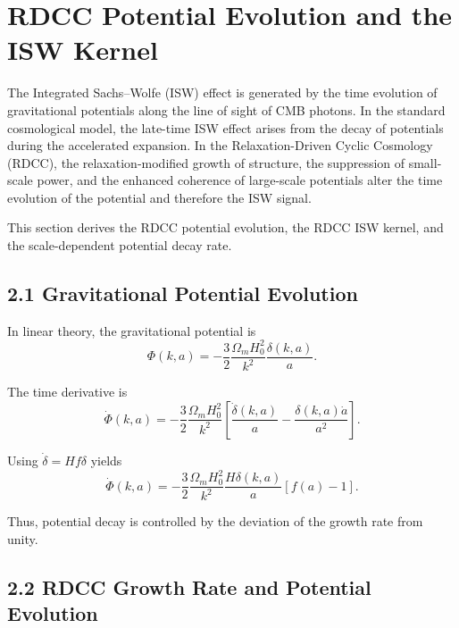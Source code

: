 \documentclass[11pt,a4paper]{article}
\begin{document}
\section{RDCC Potential Evolution and the ISW Kernel}

The Integrated Sachs–Wolfe (ISW) effect is generated by the time evolution of gravitational 
potentials along the line of sight of CMB photons. In the standard cosmological model, the 
late-time ISW effect arises from the decay of potentials during the accelerated expansion. 
In the Relaxation-Driven Cyclic Cosmology (RDCC), the relaxation-modified growth of 
structure, the suppression of small-scale power, and the enhanced coherence of large-scale 
potentials alter the time evolution of the potential and therefore the ISW signal.

This section derives the RDCC potential evolution, the RDCC ISW kernel, and the 
scale-dependent potential decay rate.

\subsection*{2.1 Gravitational Potential Evolution}

In linear theory, the gravitational potential is
\begin{equation}
    \Phi(k,a)
    = -\frac{3}{2}\frac{\Omega_{m}H_{0}^{2}}{k^{2}}
      \frac{\delta(k,a)}{a}.
\end{equation}

The time derivative is
\begin{equation}
    \dot{\Phi}(k,a)
    = -\frac{3}{2}\frac{\Omega_{m}H_{0}^{2}}{k^{2}}
      \left[
        \frac{\dot{\delta}(k,a)}{a}
        - \frac{\delta(k,a)\dot{a}}{a^{2}}
      \right].
\end{equation}

Using $\dot{\delta} = Hf\delta$ yields
\begin{equation}
    \dot{\Phi}(k,a)
    = -\frac{3}{2}\frac{\Omega_{m}H_{0}^{2}}{k^{2}}
      \frac{H\delta(k,a)}{a}
      \left[
        f(a) - 1
      \right].
\end{equation}

Thus, potential decay is controlled by the deviation of the growth rate from unity.

\subsection*{2.2 RDCC Growth Rate and Potential Evolution}
\end{document}
